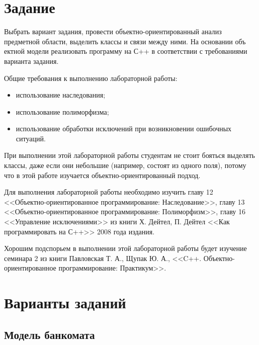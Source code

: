 \documentclass[a4paper,12pt]{article}
\begin{document}



\tableofcontents

\section{Задание}
\label{sec:Task}

Выбрать вариант задания, провести объектно-ориентированный анализ
предметной области, выделить классы и связи между ними. На основании
объ ектной модели реализовать программу на С++ в соответствии с
требованиями варианта задания.

Общие требования к выполнению лабораторной работы:

\begin{itemize}
\item использование наследования;
\item использование полиморфизма;
\item использование обработки исключений при возникновении ошибочных
  ситуаций.
\end{itemize}

При выполнении этой лабораторной работы студентам не стоит бояться
выделять классы, даже если они небольшие (например, состоят из одного
поля), потому что в этой работе изучается объектно-ориентированный
подход.

Для выполнения лабораторной работы необходимо изучить главу 12
<<Объектно-ориентированное программирование: Наследование>>, главу 13
<<Объектно-ориентированное программирование: Полиморфизм>>, главу 16
<<Управление исключениями>> из книги Х. Дейтел, П. Дейтел <<Как
программировать на С++>> 2008 года издания.

Хорошим подспорьем в выполнении этой лабораторной работы будет
изучение семинара 2 из книги Павловская Т. А., Щупак Ю. А.,
<<C++. Объектно-ориентированное программирование: Практикум>>.

\section{Варианты заданий}
\label{sec:Variants}

\subsection{Модель банкомата}
\end{document}
